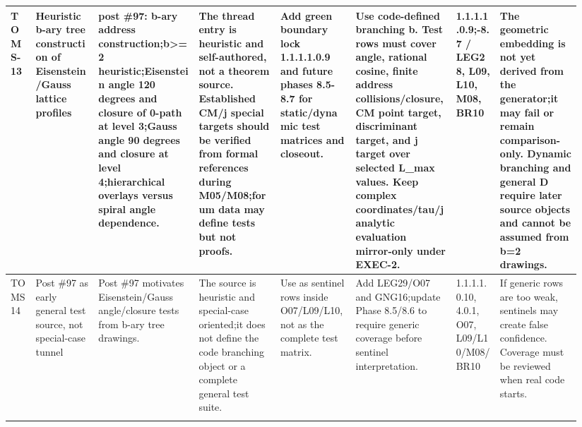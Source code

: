 \begin{longtable}{L{0.04\linewidth} L{0.105\linewidth} L{0.16\linewidth} L{0.13\linewidth} L{0.125\linewidth} L{0.165\linewidth} L{0.075\linewidth} L{0.135\linewidth}}
\hline
\addlinespace[0.24em]
TOMS-13 & Heuristic b-ary tree construction of Eisenstein/\allowbreak{}Gauss lattice profiles & post \#97: b-ary address construction;\newline b>=2 heuristic;\newline Eisenstein angle 120 degrees and closure of 0-path at level 3;\newline Gauss angle 90 degrees and closure at level 4;\newline hierarchical overlays versus spiral angle dependence. & The thread entry is heuristic and self-authored, not a theorem source. Established CM/\allowbreak{}j special targets should be verified from formal references during M05/\allowbreak{}M08;\newline forum data may define tests but not proofs. & Add green boundary lock 1.1.1.1.0.9 and future phases 8.5-8.7 for static/\allowbreak{}dynamic test matrices and closeout. & Use code-defined branching b. Test rows must cover angle, rational cosine, finite address collisions/\allowbreak{}closure, CM point target, discriminant target, and j target over selected L\_max values. Keep complex coordinates/\allowbreak{}tau/\allowbreak{}j analytic evaluation mirror-only under EXEC-2. & 1.1.1.1.0.9;-8.7 /\allowbreak{} LEG28, L09, L10, M08, BR10 & The geometric embedding is not yet derived from the generator;\newline it may fail or remain comparison-only. Dynamic branching and general D require later source objects and cannot be assumed from b=2 drawings.\\
\hline
\addlinespace[0.24em]
TOMS14 & Post \#97 as early general test source, not special-case tunnel & Post \#97 motivates Eisenstein/\allowbreak{}Gauss angle/\allowbreak{}closure tests from b-ary tree drawings. & The source is heuristic and special-case oriented;\newline it does not define the code branching object or a complete general test suite. & Use as sentinel rows inside O07/\allowbreak{}L09/\allowbreak{}L10, not as the complete test matrix. & Add LEG29/\allowbreak{}O07 and GNG16;\newline update Phase 8.5/\allowbreak{}8.6 to require generic coverage before sentinel interpretation. & 1.1.1.1.0.10, 4.0.1, O07, L09/\allowbreak{}L10/\allowbreak{}M08/\allowbreak{}BR10 & If generic rows are too weak, sentinels may create false confidence. Coverage must be reviewed when real code starts.\\
\hline
\addlinespace[0.24em]

\end{longtable}
